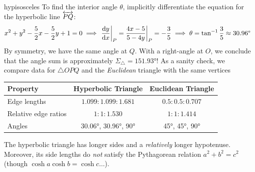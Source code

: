 \begin{example}{}{hypisosceles}
	To find the interior angle $\theta$, implicitly differentiate the equation for the hyperbolic line $\lin{PQ}$:
	\[
		x^2+y^2-\frac 52x-\frac 52y+1=0 \implies \diffat[y]{x}{P}=\frac{4x-5}{5-4y}\bigg|_P=-\frac 35 \implies \theta=\tan^{-1}\frac 35\approx \ang{30.96}
	\]
	By symmetry, we have the same angle at $Q$. With a right-angle at $O$, we conclude that the angle sum is approximately $\Sigma_\triangle=\ang{151.93}$!\smallbreak
	As a sanity check, we compare data for $\triangle OPQ$ and the \emph{Euclidean} triangle with the same vertices
	\begin{center}
		\begin{tabular}{l||c|c}
			Property&Hyperbolic Triangle&Euclidean Triangle\\\hline\hline
			Edge lengths&$1.099:1.099:1.681$&$0.5:0.5:0.707$\\
			Relative edge ratios&$1:1:1.530$&$1:1:1.414$\\
			Angles&\ang{30.06}, \ang{30.96}, \ang{90}&\ang{45}, \ang{45}, \ang{90}%
		\end{tabular}
	\end{center}
	The hyperbolic triangle has longer sides and a \emph{relatively} longer hypotenuse. Moreover, its side lengths do \emph{not} satisfy the Pythagorean relation $a^2+b^2=c^2$ (though $\cosh a\cosh b=\cosh c\ldots$).
\end{example}

